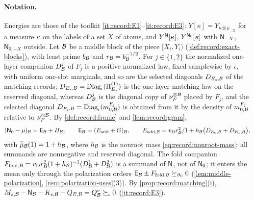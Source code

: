 \paragraph{Notation.}
Energies are those of the toolkit
\ref{it:record:E1}--\ref{it:record:E3}: $Y[\kappa]=Y_{\kappa\otimes\mu_{-X}}$
for a measure $\kappa$ on the labels of a set $X$ of atoms, and
$Y^{\mathsf N}[\kappa]$, $Y^{\mathsf N_0}[\kappa]$ with $\mathsf N_{-X}$, $\mathsf N_{0,-X}$
outside. Let $\mathcal B$ be a middle block of the piece $[X_i,Y_i)$
(\cref{def:record:exact-blocks}), with least prime $b_\mathcal B$ and
$r_\mathcal B=b_\mathcal B^{-1/2}$. For $j\in\{1,2\}$ the normalized one-layer
companion $D^j_\mathcal B$ of $F_j$ is a positive normalized law, fixed samplewise
by $\iota$, with uniform one-slot marginals, and so are the selected diagonals
$D_{E_s,\mathcal B}$ of the matching records; $D_{E_s,\mathcal B}=\operatorname{Diag}_\iota(\Pi^{(1)}_{E_s})$
is the one-layer matching law on the reserved diagonal, whereas $D^j_\mathcal B$ is the diagonal copy of $\nu_F^{\otimes\mathcal B}$ placed by $F_j$, and the selected diagonal $D_{F_j,\mathcal B}=\operatorname{Diag}_\iota(m^{F_j}_{0,\mathcal B})$ is obtained from it by the density of $m^{F_j}_{0,\mathcal B}$ relative to $\nu_F^{\otimes\mathcal B}$. By \cref{def:record:frame} and \cref{lem:record:gram},
\[
 (\mathsf N_0-\mu)_\mathcal B=\mathsf E_\mathcal B+H_\mathcal B,\qquad\mathsf E_\mathcal B=(E_{\rm add}+G)_\mathcal B,
 \qquad E_{{\rm add},\mathcal B}=v_{\rm D}r_\mathcal B^2/1+h_\mathcal B\bigl(D_{E_0,\mathcal B}+D_{E_1,\mathcal B}\bigr),
\]
with $\widetilde\mu_\mathcal B(1)=1+h_\mathcal B$, where $h_\mathcal B$ is the nonroot mass
\eqref{eq:record:nonroot-mass}; all summands are nonnegative and reserved
diagonal. The fold companion
$F_{{\rm fold},\mathcal B}=v_{\rm D}r_\mathcal B^2(1+h_\mathcal B)^{-1}(D^1_\mathcal B+D^2_\mathcal B)$ is a summand of
$\mathsf N$, not of $\mathsf N_0$; it enters the mean only through the polarization orders
$\mathsf E_\mathcal B\pm F_{{\rm fold},\mathcal B}\succeq_{\vartheta_0}0$
(\cref{lem:middle-polarization}, \cref{rem:polarization-uses}(3)). By
\cref{prop:record:matching}(i),
$M_{s,\mathcal B}-\mathsf N_\mathcal B-K_{s,\mathcal B}-Q_{E,\mathcal B}=Q^\circ_\mathcal B\succeq_\iota0$
(\ref{it:record:E3}).

